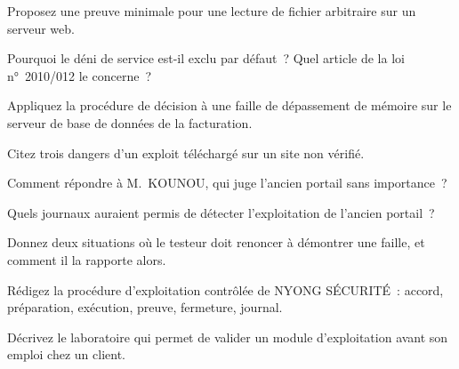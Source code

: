 \begin{boxexo}[title={\ding{45}\quad Exercice~8.2. Preuve minimale \niveaubase}]
Proposez une preuve minimale pour une lecture de fichier arbitraire sur un
serveur web.
\end{boxexo}

\begin{boxexo}[title={\ding{45}\quad Exercice~8.3. Déni de service \niveaubase}]
Pourquoi le déni de service est-il exclu par défaut~? Quel article de la loi
n°~2010/012 le concerne~?
\end{boxexo}

\begin{boxexo}[title={\ding{45}\quad Exercice~8.4. Décider \niveaumoyen}]
Appliquez la procédure de décision à une faille de dépassement de mémoire
sur le serveur de base de données de la facturation.
\end{boxexo}

\begin{boxexo}[title={\ding{45}\quad Exercice~8.5. L'exploit inconnu \niveaumoyen}]
Citez trois dangers d'un exploit téléchargé sur un site non vérifié.
\end{boxexo}

\begin{boxexo}[title={\ding{45}\quad Exercice~8.6. « Ne sert plus à rien » \niveaumoyen}]
Comment répondre à M.~KOUNOU, qui juge l'ancien portail sans importance~?
\end{boxexo}

\begin{boxexo}[title={\ding{45}\quad Exercice~8.7. La détection \niveaumoyen}]
Quels journaux auraient permis de détecter l'exploitation de l'ancien
portail~?
\end{boxexo}

\begin{boxexo}[title={\ding{45}\quad Exercice~8.8. Ne pas démontrer \niveaumoyen}]
Donnez deux situations où le testeur doit renoncer à démontrer une faille,
et comment il la rapporte alors.
\end{boxexo}

\begin{boxexo}[title={\ding{45}\quad Exercice~8.9. Une procédure \niveauexpert}]
Rédigez la procédure d'exploitation contrôlée de NYONG SÉCURITÉ~: accord,
préparation, exécution, preuve, fermeture, journal.
\end{boxexo}

\begin{boxexo}[title={\ding{45}\quad Exercice~8.10. Laboratoire \niveauexpert}]
Décrivez le laboratoire qui permet de valider un module d'exploitation avant
son emploi chez un client.
\end{boxexo}

